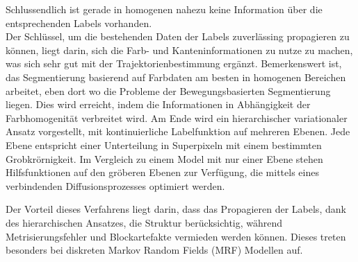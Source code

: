 Schlussendlich ist gerade in homogenen nahezu keine Information über die entsprechenden Labels vorhanden.
\\
Der Schlüssel, um die bestehenden Daten der Labels zuverlässing propagieren zu können, liegt darin, sich die Farb- und Kanteninformationen
zu nutze zu machen, was sich sehr gut mit der Trajektorienbestimmung ergänzt. Bemerkenswert ist, das Segmentierung basierend auf Farbdaten
am besten in homogenen Bereichen arbeitet, eben dort wo die Probleme der Bewegungsbasierten Segmentierung liegen.
Dies wird erreicht, indem die Informationen in Abhängigkeit der Farbhomogenität verbreitet wird. Am Ende wird ein hierarchischer variationaler Ansatz
vorgestellt, mit kontinuierliche Labelfunktion auf mehreren Ebenen. Jede Ebene entspricht einer Unterteilung in Superpixeln mit einem bestimmten
Grobkrörnigkeit. Im Vergleich zu einem Model mit nur einer Ebene stehen  Hilfsfunktionen auf den gröberen Ebenen zur Verfügung, die mittels eines
verbindenden Diffusionsprozesses optimiert werden.

Der Vorteil dieses Verfahrens liegt darin, dass das Propagieren der Labels, dank des hierarchischen Ansatzes, die Struktur berücksichtig, während Metrisierungsfehler und Blockartefakte vermieden werden können. Dieses treten besonders bei diskreten Markov Random Fields (MRF) Modellen auf.
